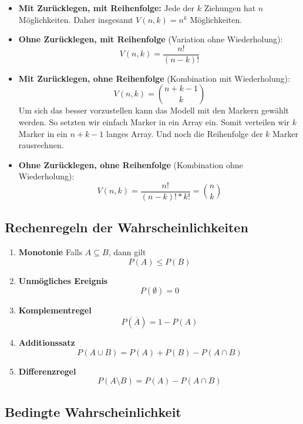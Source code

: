\documentclass[a4paper]{article}
\begin{document}
\begin{itemize}
    \item \textbf{Mit Zurücklegen, mit Reihenfolge:}  
    Jede der $k$ Ziehungen hat $n$ Möglichkeiten. Daher insgesamt $V(n,k)=n^k$ Möglichkeiten.

    \item \textbf{Ohne Zurücklegen, mit Reihenfolge}  (Variation ohne Wiederholung):
    \[
    V(n,k)=\frac{n!}{(n-k)!}
    \]

    \item \textbf{Mit Zurücklegen, ohne Reihenfolge}  (Kombination mit Wiederholung):
    \[
    V(n,k)=\binom{n+k-1}{k}
    \]
    Um sich das besser vorzustellen kann das Modell mit den Markern gewählt werden. So setzten wir einfach Marker in ein Array ein. Somit verteilen wir $k$ Marker in ein $n+k-1$ langes Array. Und noch die Reihenfolge der $k$ Marker rausrechnen.

    \item \textbf{Ohne Zurücklegen, ohne Reihenfolge}  (Kombination ohne Wiederholung): 
    \[
    V(n,k)=\frac{n!}{(n-k)!*k!}=\binom{n}{k}
    \]
\end{itemize}

\subsection{Rechenregeln der Wahrscheinlichkeiten}

\begin{enumerate}

\item \textbf{Monotonie}
Falls $A \subseteq B$, dann gilt
\[
P(A) \leq P(B)
\]

\item \textbf{Unmögliches Ereignis}
\[
P(\emptyset) = 0
\]

\item \textbf{Komplementregel}
\[
P(\overline{A}) = 1 - P(A)
\]

\item \textbf{Additionssatz}
\[
P(A \cup B) = P(A) + P(B) - P(A \cap B)
\]

\item \textbf{Differenzregel}
\[
P(A \setminus B) = P(A) - P(A \cap B)
\]

\end{enumerate}

\subsection{Bedingte Wahrscheinlichkeit}
\end{document}
